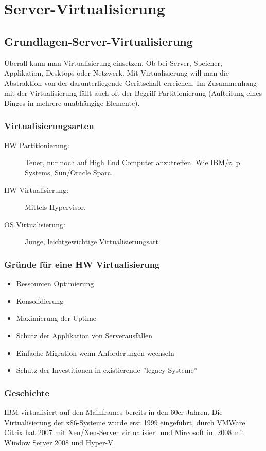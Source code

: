 \chapter{Server-Virtualisierung}

\section{Grundlagen-Server-Virtualisierung}
Überall kann man Virtualisierung einsetzen. Ob bei Server, Speicher, Applikation, Desktops oder Netzwerk. Mit Virtualisierung will man die Abstraktion von der darunterliegende Gerätschaft erreichen. Im Zusammenhang mit der Virtualisierung fällt auch oft der Begriff Partitionierung (Aufteilung eines Dinges in mehrere unabhängige Elemente).

\subsection{Virtualisierungsarten}
\label{sec:virtualisierungsarten}
\begin{description}
	\item[HW Partitionierung:] Teuer, nur noch auf High End Computer anzutreffen. Wie IBM/z, p Systems, Sun/Oracle Sparc.
	\item[HW Virtualisierung:] Mittels Hypervisor.
	\item[OS Virtualisierung:] Junge, leichtgewichtige Virtualisierungsart.
\end{description}

\subsection{Gründe für eine HW Virtualisierung}
\label{sec:gruende-hw-virtualisierung}
\begin{itemize}
	\item Ressourcen Optimierung
	\item Konsolidierung
	\item Maximierung der Uptime
	\item Schutz der Applikation von Serverausfällen
	\item Einfache Migration wenn Anforderungen wechseln
	\item Schutz der Investitionen in existierende ''legacy Systeme'' 
\end{itemize}

\subsection{Geschichte}
IBM virtualisiert auf den Mainframes bereits in den 60er Jahren. Die Virtualisierung der x86-Systeme wurde erst 1999 eingeführt, durch VMWare. Citrix hat 2007 mit Xen/Xen-Server virtualisiert und Mircosoft im 2008 mit Window Server 2008 und Hyper-V.

